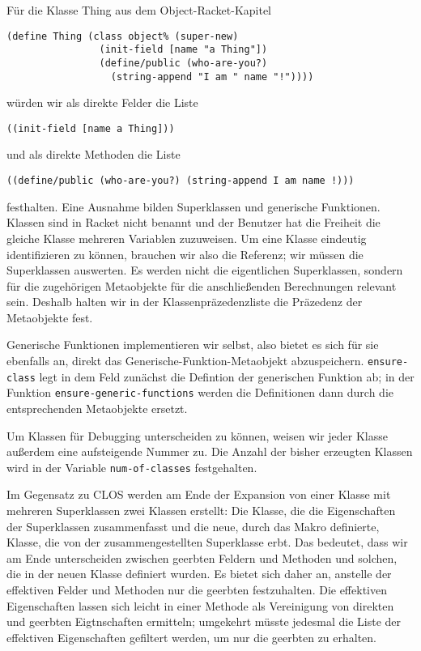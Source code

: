 Für die Klasse Thing aus dem Object-Racket-Kapitel

\begin{lstlisting}
(define Thing (class object% (super-new)
                (init-field [name "a Thing"])
                (define/public (who-are-you?) 
                  (string-append "I am " name "!"))))
\end{lstlisting}

würden wir als direkte Felder die Liste 

\texttt{{\textquotesingle}((init-field [name {\qq}a Thing\qq]))} 

und als direkte Methoden die Liste 

\texttt{{\textquotesingle}((define/public (who-are-you?) (string-append {\qq}I am {\qq} name \qq!\qq)))} 

festhalten. Eine Ausnahme bilden Superklassen und generische Funktionen. Klassen sind in Racket nicht benannt und der Benutzer hat die Freiheit die gleiche Klasse mehreren Variablen zuzuweisen. Um eine Klasse eindeutig identifizieren zu können, brauchen wir also die Referenz; wir müssen die Superklassen auswerten. Es werden nicht die eigentlichen Superklassen, sondern für die zugehörigen Metaobjekte für die anschließenden Berechnungen relevant sein. Deshalb halten wir in der Klassenpräzedenzliste die Präzedenz der Metaobjekte fest. 

Generische Funktionen implementieren wir selbst, also bietet es sich für sie ebenfalls an, direkt das Generische-Funktion-Metaobjekt abzuspeichern. \texttt{ensure-class} legt in dem Feld zunächst die Defintion der generischen Funktion ab; in der Funktion \texttt{ensure-generic-functions} werden die Definitionen dann durch die entsprechenden Metaobjekte ersetzt.

Um Klassen für Debugging unterscheiden zu können, weisen wir jeder Klasse außerdem eine aufsteigende Nummer zu. Die Anzahl der bisher erzeugten Klassen wird in der Variable \texttt{num-of-classes} festgehalten.

Im Gegensatz zu CLOS werden am Ende der Expansion von einer Klasse mit mehreren Superklassen zwei Klassen erstellt: Die Klasse, die die Eigenschaften der Superklassen zusammenfasst und die neue, durch das Makro definierte, Klasse, die von der zusammengestellten Superklasse erbt. Das bedeutet, dass wir am Ende unterscheiden zwischen geerbten Feldern und Methoden und solchen, die in der neuen Klasse definiert wurden. Es bietet sich daher an, anstelle der effektiven Felder und Methoden nur die geerbten festzuhalten. Die effektiven Eigenschaften lassen sich leicht in einer Methode als Vereinigung von direkten und geerbten Eigtnschaften ermitteln; umgekehrt müsste jedesmal die Liste der effektiven Eigenschaften gefiltert werden, um nur die geerbten zu erhalten. 

